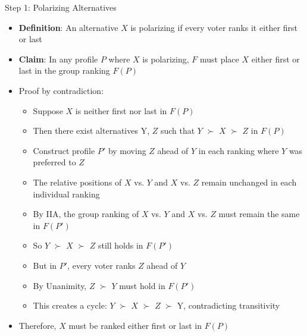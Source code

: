 \documentclass[10pt]{beamer}
\begin{document}
\begin{frame}{Step 1: Polarizing Alternatives}
  \begin{itemize}[<+->]
    \item \textbf{Definition}: An alternative $X$ is polarizing if every voter ranks it either first or last
    \item \textbf{Claim}: In any profile $P$ where $X$ is polarizing, $F$ must place $X$ either first or last in the group ranking $F(P)$
    \item Proof by contradiction:
      \begin{itemize}
        \item Suppose $X$ is neither first nor last in $F(P)$
        \item Then there exist alternatives Y, $Z$ such that $Y$ $\succ$ $X$ $\succ$ $Z$ in $F(P)$
        \item Construct profile $P'$ by moving $Z$ ahead of $Y$ in each ranking where $Y$ was preferred to $Z$ 
        \item The relative positions of $X$ vs. $Y$ and $X$ vs. $Z$ remain unchanged in each individual ranking
        \item By IIA, the group ranking of $X$ vs. $Y$ and $X$ vs. $Z$ must remain the same in $F(P')$
        \item So $Y$ $\succ$ $X$ $\succ$ $Z$ still holds in $F(P')$
        \item But in $P'$, every voter ranks $Z$ ahead of $Y$
        \item By Unanimity, $Z$ $\succ$ $Y$ must hold in $F(P')$
        \item This creates a cycle: $Y$ $\succ$ $X$ $\succ$ $Z$ $\succ$ Y, contradicting transitivity
      \end{itemize}
    \item Therefore, $X$ must be ranked either first or last in $F(P)$
  \end{itemize}
\end{frame}
\end{document}
